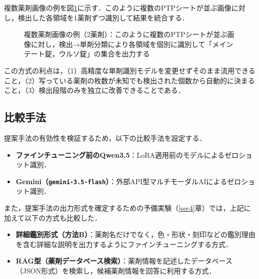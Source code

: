 \documentclass[dvipdfmx]{jsarticle}
\begin{document}
複数薬剤画像の例を図\ref{fig:example_multi}に示す．このように複数のPTPシートが並ぶ画像に対し，検出した各領域を1薬剤ずつ識別して結果を統合する．

\begin{figure}[htbp]
\centering
{}
\caption{複数薬剤画像の例（2薬剤）：このように複数のPTPシートが並ぶ画像に対し，検出→単剤分類により各領域を個別に識別して「メインテート錠，ウルソ錠」の集合を出力する}
\label{fig:example_multi}
\end{figure}

この方式の利点は，（1）高精度な単剤識別モデルを変更せずそのまま流用できること，（2）写っている薬剤の枚数が未知でも検出された個数から自動的に決まること，（3）検出段階のみを独立に改善できることである．

\subsection{比較手法}

提案手法の有効性を検証するため，以下の比較手法を設定する．

\begin{itemize}
  \item \textbf{ファインチューニング前のQwen3.5}：LoRA適用前のモデルによるゼロショット識別．
  \item \textbf{Gemini（\texttt{gemini-3.5-flash}）}：外部API型マルチモーダルAIによるゼロショット識別．
\end{itemize}

また，提案手法の出力形式を確定するための予備実験（\ref{sec4}章）では，上記に加えて以下の方式も比較した．

\begin{itemize}
  \item \textbf{詳細鑑別形式（方法B）}：薬剤名だけでなく，色・形状・刻印などの鑑別理由を含む詳細な説明を出力するようにファインチューニングする方式．
  \item \textbf{RAG型（薬剤データベース検索）}：薬剤情報を記述したデータベース（JSON形式）を検索し，候補薬剤情報を回答に利用する方式．
\end{itemize}
\end{document}
